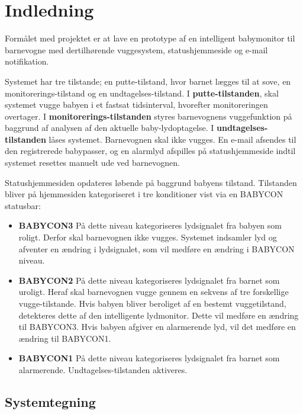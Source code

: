 \section{Indledning}

Formålet med projektet er at lave en prototype af en intelligent babymonitor til barnevogne med dertilhørende vuggesystem, statushjemmeside og e-mail notifikation.

Systemet har tre tilstande; en putte-tilstand, hvor barnet lægges til at sove, en monitorerings-tilstand og en undtagelses-tilstand.
I \textbf{putte-tilstanden}, skal systemet vugge babyen i et fastsat tidsinterval, hvorefter monitoreringen overtager.
I \textbf{monitorerings-tilstanden} styres barnevognens vuggefunktion på baggrund af analysen af den aktuelle baby-lydoptagelse.
I \textbf{undtagelses-tilstanden} låses systemet. Barnevognen skal ikke vugges. En e-mail afsendes til den registrerede babypasser, og en alarmlyd afspilles på statushjemmeside indtil systemet resettes manuelt ude ved barnevognen. 

Statushjemmesiden opdateres løbende  på baggrund babyens tilstand. Tilstanden bliver på hjemmesiden kategoriseret i tre konditioner vist via en BABYCON statusbar:

\begin{itemize}
\item \textbf{BABYCON3} 
\newline På dette niveau kategoriseres lydsignalet fra babyen som roligt. Derfor skal barnevognen ikke vugges. Systemet indsamler lyd og afventer en ændring i lydsignalet, som vil medføre en ændring i BABYCON niveau. 

\item \textbf{BABYCON2}
\newline På dette niveau kategoriseres lydsignalet fra barnet som uroligt. Heraf skal barnevognen vugge gennem en sekvens af tre forskellige vugge-tilstande. Hvis babyen bliver beroliget af en bestemt vuggetilstand, detekteres dette af den intelligente lydmonitor. Dette vil medføre en ændring til BABYCON3. Hvis babyen afgiver en alarmerende lyd, vil det medføre en ændring til BABYCON1.  

\item \textbf{BABYCON1}
\newline På dette niveau kategoriseres lydsignalet fra barnet som alarmerende. Undtagelses-tilstanden aktiveres. 
\end{itemize}
 
\subsection*{Systemtegning}

